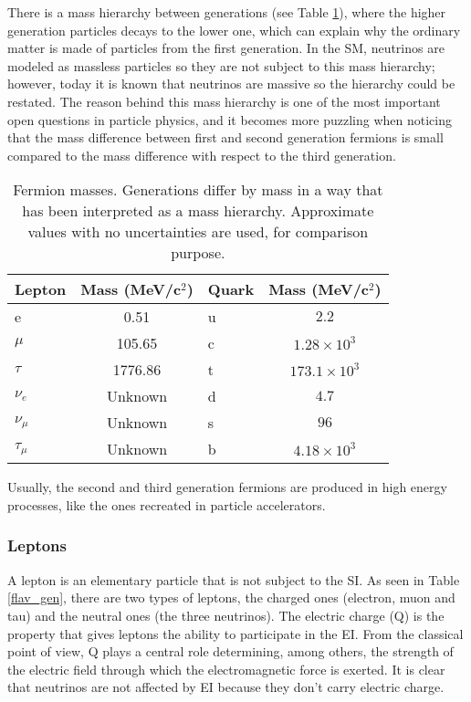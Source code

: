 There is a mass hierarchy between generations (see Table \ref{f_masses}), where the higher generation particles decays to the lower one, which can explain why the ordinary matter is made of particles from the first generation. In the SM, neutrinos are modeled as massless particles so they are not subject to this mass hierarchy; however, today it is known that neutrinos are massive so the hierarchy could be restated. The reason behind this mass hierarchy is one of the most important open questions in particle physics, and it becomes more puzzling when noticing that the mass difference between first and second generation fermions is small compared to the mass difference with respect to the third generation.
\begin{center}
\begin{table}[h]
\centering
\footnotesize
\begin{tabular}{lclc} \hline
Lepton    & Mass (MeV/c$^2$) & Quark  & Mass (MeV/c$^2$)       \\ \hline
e         & 0.51             & u      & $ 2.2$             \\ %
$\mu$     & 105.65           & c      & $ 1.28\times 10^3$ \\ %
$\tau$    & 1776.86          & t      & $ 173.1\times 10^3$\\ %
$\nu_e$   & Unknown          & d      & $ 4.7$             \\ %
$\nu_\mu$ & Unknown          & s      & $ 96$              \\ %
$\tau_\mu$& Unknown          & b      & $ 4.18\times 10^3$ \\ \hline
\end{tabular}
\caption[Fermion masses.]{Fermion masses\cite{pdg}. Generations differ by mass in a way that has been interpreted as a mass hierarchy. Approximate values with no uncertainties are used, for comparison purpose.}\label{f_masses}
\end{table}
\end{center}

Usually, the second and third generation fermions are produced in high energy processes, like the ones recreated in particle accelerators.         

\subsubsection{Leptons}

A lepton is an elementary particle that is not subject to the SI. As seen in Table \ref{flav_gen}, there are two types of leptons, the charged ones (electron, muon and tau) and the neutral ones (the three neutrinos). The electric charge (Q) is the property that gives leptons the ability to participate in the EI. From the classical point of view, Q plays a central role determining, among others, the strength of the electric field through which the electromagnetic force is exerted. It is clear that neutrinos are not affected by EI because they don't carry electric charge.

